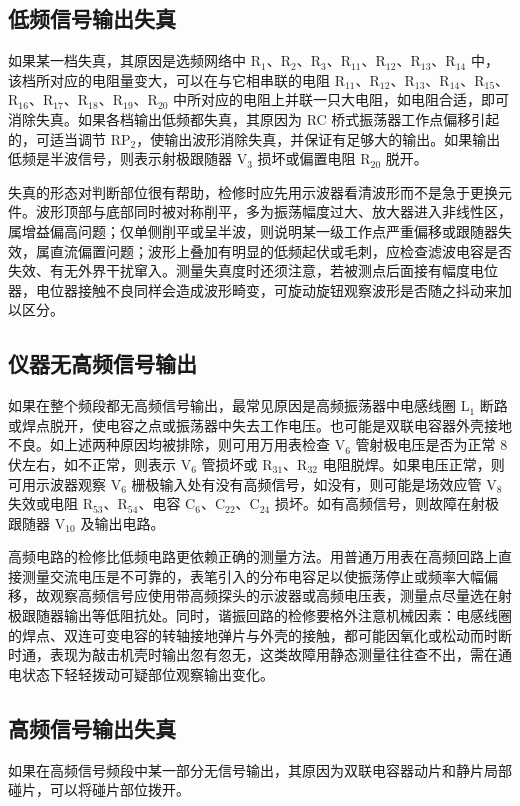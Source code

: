 \documentclass[12pt,UTF8]{ctexbook}
\begin{document}
	\subsection{低频信号输出失真}
	如果某一档失真，其原因是选频网络中 R\(_1\)、R\(_2\)、R\(_3\)、R\(_{11}\)、R\(_{12}\)、R\(_{13}\)、R\(_{14}\) 中，该档所对应的电阻量变大，可以在与它相串联的电阻 R\(_{11}\)、R\(_{12}\)、R\(_{13}\)、R\(_{14}\)、R\(_{15}\)、R\(_{16}\)、R\(_{17}\)、R\(_{18}\)、R\(_{19}\)、R\(_{20}\) 中所对应的电阻上并联一只大电阻，如电阻合适，即可消除失真。如果各档输出低频都失真，其原因为 RC 桥式振荡器工作点偏移引起的，可适当调节 RP\(_2\)，使输出波形消除失真，并保证有足够大的输出。如果输出低频是半波信号，则表示射极跟随器 V\(_3\) 损坏或偏置电阻 R\(_{20}\) 脱开。
	
	失真的形态对判断部位很有帮助，检修时应先用示波器看清波形而不是急于更换元件。波形顶部与底部同时被对称削平，多为振荡幅度过大、放大器进入非线性区，属增益偏高问题；仅单侧削平或呈半波，则说明某一级工作点严重偏移或跟随器失效，属直流偏置问题；波形上叠加有明显的低频起伏或毛刺，应检查滤波电容是否失效、有无外界干扰窜入。测量失真度时还须注意，若被测点后面接有幅度电位器，电位器接触不良同样会造成波形畸变，可旋动旋钮观察波形是否随之抖动来加以区分。
	
	\subsection{仪器无高频信号输出}
	如果在整个频段都无高频信号输出，最常见原因是高频振荡器中电感线圈 L\(_1\) 断路或焊点脱开，使电容之点或振荡器中失去工作电压。也可能是双联电容器外壳接地不良。如上述两种原因均被排除，则可用万用表检查 V\(_6\) 管射极电压是否为正常 8 伏左右，如不正常，则表示 V\(_6\) 管损坏或 R\(_{31}\)、R\(_{32}\) 电阻脱焊。如果电压正常，则可用示波器观察 V\(_6\) 栅极输入处有没有高频信号，如没有，则可能是场效应管 V\(_8\) 失效或电阻 R\(_{53}\)、R\(_{54}\)、电容 C\(_6\)、C\(_{22}\)、C\(_{24}\) 损坏。如有高频信号，则故障在射极跟随器 V\(_{10}\) 及输出电路。
	
	高频电路的检修比低频电路更依赖正确的测量方法。用普通万用表在高频回路上直接测量交流电压是不可靠的，表笔引入的分布电容足以使振荡停止或频率大幅偏移，故观察高频信号应使用带高频探头的示波器或高频电压表，测量点尽量选在射极跟随器输出等低阻抗处。同时，谐振回路的检修要格外注意机械因素：电感线圈的焊点、双连可变电容的转轴接地弹片与外壳的接触，都可能因氧化或松动而时断时通，表现为敲击机壳时输出忽有忽无，这类故障用静态测量往往查不出，需在通电状态下轻轻拨动可疑部位观察输出变化。
	
	\subsection{高频信号输出失真}
	如果在高频信号频段中某一部分无信号输出，其原因为双联电容器动片和静片局部碰片，可以将碰片部位拨开。
	
\end{document}
